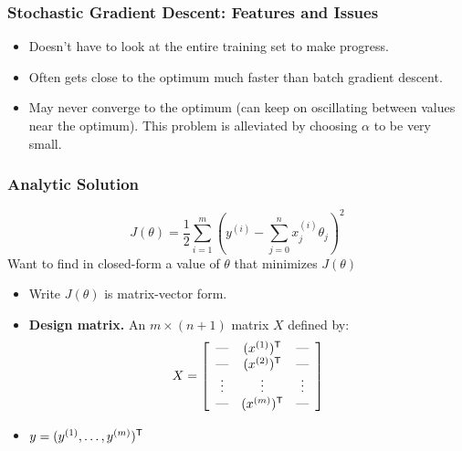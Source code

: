 \documentclass[xcolor=table]{beamer}
\newcommand{\trans}[1]{\ensuremath{#1}^{\scriptsize{\textsf{T}}}}
\begin{document}
\begin{frame}[t]
\frametitle{Stochastic Gradient Descent: Features and Issues}
\begin{itemize}
    \item Doesn't have to look at the entire training set to make progress.

    \item Often gets close to the optimum much faster than batch gradient descent.

    \item May never converge to the optimum (can keep on oscillating between values 
    near the optimum). This problem is alleviated by choosing $\alpha$ to be very
    small.
\end{itemize}
\end{frame}

\begin{frame}[t]
\frametitle{Analytic Solution}
\[J(\theta) = 
    \frac{1}{2} \sum_{i = 1}^{m} \left (y^{(i)} - \sum_{j = 0}^{n} x^{(i)}_j \theta_j \right )^2\]  
Want to find in closed-form a value of $\theta$ that minimizes $J(\theta)$ 

\begin{itemize}
    \item Write $J(\theta)$ is matrix-vector form.
    
    \pause

    \item \textbf{Design matrix.} An $m \times (n + 1)$ matrix $X$ defined by:
    \[
        X = \left [ \begin{array}{ccc}
                        \hbox{---} & \trans{(x^{(1)})} & \hbox{---} \\
                        \hbox{---} & \trans{(x^{(2)})} & \hbox{---} \\
                        \vdots     & \vdots                   & \vdots     \\
                        \hbox{---} & \trans{(x^{(m)})} & \hbox{---} \\
                   \end{array}
            \right ]
    \]

    \pause

    \item $y = \trans{(y^{(1)}, \ldots, y^{(m)})}$
\end{itemize}
\end{frame}
\end{document}
